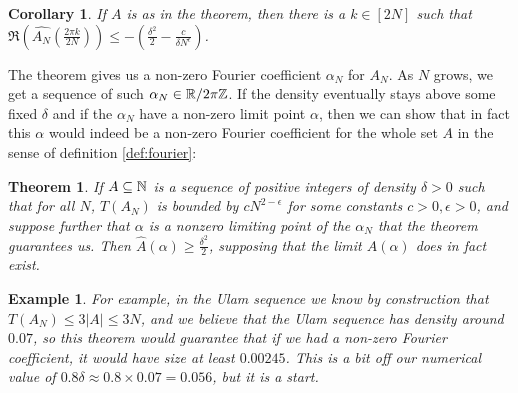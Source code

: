 \documentclass{report}
\newtheorem{theorem}{Theorem}[section]
\newtheorem{corollary}{Corollary}[theorem]
\newtheorem{example}{Example}
\theoremstyle{remark}
\numberwithin{equation}{section}
\begin{document}
\begin{corollary}\label{thm:alpha_real}
  If $A$ is as in the theorem, then there is a $k \in [2N]$ such that
  $\Re(\widehat{A_N}(\frac{2\pi k}{2N})) \leq -\left(\frac{\delta^2}{2} -
  \frac{c}{\delta N^\epsilon}\right)$.
\end{corollary}

The theorem gives us a non-zero Fourier coefficient $\alpha_N$ for
$A_N$.  As $N$ grows, we get a sequence of such
$\alpha_N \in \mathbb{R}/2\pi\mathbb{Z}$.  If the density eventually stays above some
fixed $\delta$ and if the $\alpha_N$ have a non-zero limit point
$\alpha$, then we can show that in fact this $\alpha$ would indeed be
a non-zero Fourier coefficient for the whole set $A$ in the sense of
definition \ref{def:fourier}:


\begin{theorem}\label{thm:alpha}
  If $A \subseteq \mathbb{N}$ is a sequence of positive integers of density
  $\delta > 0$ such that for all $N$, $T(A_N)$ is bounded by
  $c N^{2-\epsilon}$ for some constants $c > 0, \epsilon > 0$, and
  suppose further that $\alpha$ is a nonzero limiting point of the
  $\alpha_N$ that the theorem guarantees us.  Then
  $\widehat{A}(\alpha) \geq \frac{\delta^2}{2}$, supposing that the
  limit $\widehat{A}(\alpha)$ does in fact exist.
\end{theorem}

\begin{example}
  For example, in the Ulam sequence we know by construction that
  $T(A_N) \leq 3|A| \leq 3N$, and we believe that the Ulam sequence
  has density around $0.07$, so this theorem would guarantee that if
  we had a non-zero Fourier coefficient, it would have size at least
  $0.00245$.  This is a bit off our numerical value of
  $0.8\delta \approx 0.8 \times 0.07 = 0.056$, but it is a start.
\end{example}
\end{document}
